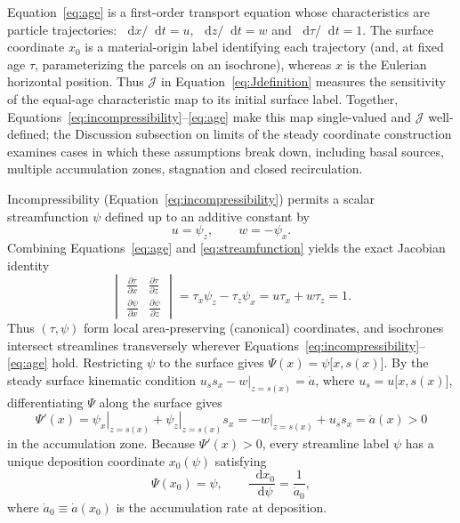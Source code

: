 \documentclass[review]{igs}
\begin{document}
Equation~\ref{eq:age} is a first-order transport equation whose characteristics are particle trajectories: \(\mathop{}\!\mathrm{d}x/\mathop{}\!\mathrm{d}t=u\), \(\mathop{}\!\mathrm{d}z/\mathop{}\!\mathrm{d}t=w\) and \(\mathop{}\!\mathrm{d}\tau/\mathop{}\!\mathrm{d}t=1\). The surface coordinate \(x_0\) is a material-origin label identifying each trajectory (and, at fixed age \(\tau\), parameterizing the parcels on an isochrone), whereas \(x\) is the Eulerian horizontal position. Thus \(\mathcal{J}\) in Equation~\ref{eq:Jdefinition} measures the sensitivity of the equal-age characteristic map to its initial surface label. Together, Equations~\ref{eq:incompressibility}--\ref{eq:age} make this map single-valued and \(\mathcal{J}\) well-defined; the Discussion subsection on limits of the steady coordinate construction examines cases in which these assumptions break down, including basal sources, multiple accumulation zones, stagnation and closed recirculation.

Incompressibility (Equation~\ref{eq:incompressibility}) permits a scalar streamfunction \(\psi\) defined up to an additive constant by
\begin{equation}
 u=\psi_z,
 \qquad
 w=-\psi_x.
 \label{eq:streamfunction}
\end{equation}
Combining Equations~\ref{eq:age} and \ref{eq:streamfunction} yields the exact Jacobian identity
\begin{equation}
\begin{vmatrix}
\displaystyle\frac{\partial\tau}{\partial x} & \displaystyle\frac{\partial\tau}{\partial z} \\[1.2ex]
\displaystyle\frac{\partial\psi}{\partial x} & \displaystyle\frac{\partial\psi}{\partial z}
\end{vmatrix}
=\tau_x\psi_z-\tau_z\psi_x
=u\tau_x+w\tau_z
=1.
\label{eq:agepsiJacobian}
\end{equation}
Thus \((\tau,\psi)\) form local area-preserving (canonical) coordinates, and isochrones intersect streamlines transversely wherever Equations~\ref{eq:incompressibility}--\ref{eq:age} hold. Restricting \(\psi\) to the surface gives \(\Psi(x)=\psi\bigl[x,s(x)\bigr]\). By the steady surface kinematic condition \(u_s s_x-\left.w\right|_{z=s(x)}=\dot a\), where \(u_s=u\bigl[x,s(x)\bigr]\), differentiating \(\Psi\) along the surface gives
\begin{equation}
\Psi'(x)
=\left.\psi_x\right|_{z=s(x)}+\left.\psi_z\right|_{z=s(x)}s_x
=-\left.w\right|_{z=s(x)}+u_ss_x
=\dot a(x)>0
\label{eq:PsiPrime}
\end{equation}
in the accumulation zone. Because \(\Psi'(x)>0\), every streamline label \(\psi\) has a unique deposition coordinate \(x_0(\psi)\) satisfying
\begin{equation}
\Psi(x_0)=\psi,
\qquad
\frac{\mathop{}\!\mathrm{d} x_0}{\mathop{}\!\mathrm{d}\psi}=\frac{1}{\dot a_0},
\label{eq:x0psi}
\end{equation}
where \(\dot a_0\equiv\dot a(x_0)\) is the accumulation rate at deposition.
\end{document}
